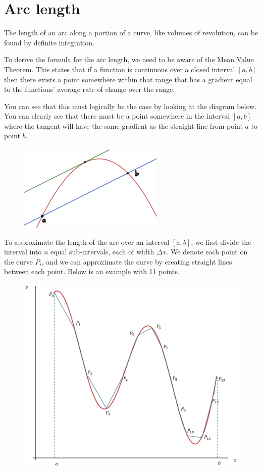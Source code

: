 \documentclass[../main.tex]{subfiles}
\begin{document}
\section{Arc length}
The length of an arc along a portion of a curve, like volumes of revolution, can be found by definite integration.

To derive the formula for the arc length, we need to be aware of the Mean Value Theorem. This states that if a function is continuous over a closed interval $[a, b]$ then there exists a point somewhere within that range that has a gradient equal to the functions' average rate of change over the range.

You can see that this must logically be the case by looking at the diagram below. You can clearly see that there must be a point somewhere in the interval $[a,b]$ where the tangent will have the same gradient as the straight line from point $a$ to point $b$.

\begin{figure}[h]
    \centering
    \includegraphics[width=0.3\linewidth]{images/arclength1.png}
\end{figure}

To approximate the length of the arc over an interval $[a,b]$, we first divide the interval into $n$ equal sub-intervals, each of width $\Delta x$. We denote each point on the curve $P_i$, and we can approximate the curve by creating straight lines between each point. Below is an example with 11 points.

\begin{figure}[h]
    \centering
    \includegraphics[width=0.6\linewidth]{images/arclength5.png}
\end{figure}
\end{document}
